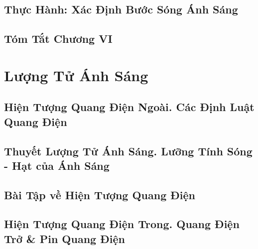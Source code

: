 \documentclass{article}
\numberwithin{equation}{section}
\begin{document}

\subsection{Thực Hành: Xác Định Bước Sóng Ánh Sáng}


\subsection{Tóm Tắt Chương VI}


\section{Lượng Tử Ánh Sáng}

\subsection{Hiện Tượng Quang Điện Ngoài. Các Định Luật Quang Điện}


\subsection{Thuyết Lượng Tử Ánh Sáng. Lưỡng Tính Sóng - Hạt của Ánh Sáng}


\subsection{Bài Tập về Hiện Tượng Quang Điện}


\subsection{Hiện Tượng Quang Điện Trong. Quang Điện Trở \& Pin Quang Điện}

\end{document}
